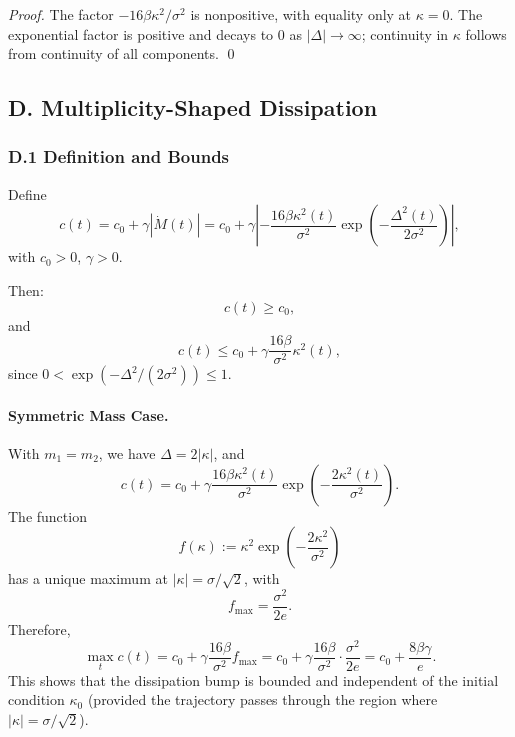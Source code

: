 \documentclass[11pt]{article}
\begin{document}
\emph{Proof.} The factor $-16\beta\kappa^2/\sigma^2$ is nonpositive, with equality only at $\kappa=0$. The exponential factor is positive and decays to $0$ as $|\Delta|\to\infty$; continuity in $\kappa$ follows from continuity of all components. \qed

\subsection*{D. Multiplicity-Shaped Dissipation}

\subsubsection*{D.1 Definition and Bounds}

Define
\begin{equation}
  c(t) = c_0 + \gamma |\dot M(t)|
       = c_0 + \gamma \left|
         -\frac{16\beta\kappa^2(t)}{\sigma^2}
         \exp\left(-\frac{\Delta^2(t)}{2\sigma^2}\right)
       \right|,
\end{equation}
with $c_0>0$, $\gamma>0$.

Then:
\[
  c(t) \ge c_0,
\]
and
\begin{equation}
  c(t) \le c_0 + \gamma \frac{16\beta}{\sigma^2}\kappa^2(t),
\end{equation}
since $0<\exp(-\Delta^2/(2\sigma^2))\le 1$.

\paragraph{Symmetric Mass Case.} With $m_1=m_2$, we have $\Delta = 2|\kappa|$, and
\begin{equation}
  c(t) = c_0 + \gamma \frac{16\beta\kappa^2(t)}{\sigma^2}
                 \exp\left(-\frac{2\kappa^2(t)}{\sigma^2}\right).
\end{equation}
The function
\[
  f(\kappa) := \kappa^2 \exp\left(-\frac{2\kappa^2}{\sigma^2}\right)
\]
has a unique maximum at $|\kappa| = \sigma/\sqrt{2}$, with
\[
  f_{\max} = \frac{\sigma^2}{2e}.
\]
Therefore,
\begin{equation}
  \max_t c(t)
  = c_0 + \gamma \frac{16\beta}{\sigma^2} f_{\max}
  = c_0 + \gamma \frac{16\beta}{\sigma^2} \cdot \frac{\sigma^2}{2e}
  = c_0 + \frac{8\beta\gamma}{e}.
\end{equation}
This shows that the dissipation bump is bounded and independent of the initial condition $\kappa_0$ (provided the trajectory passes through the region where $|\kappa|=\sigma/\sqrt{2}$).
\end{document}
